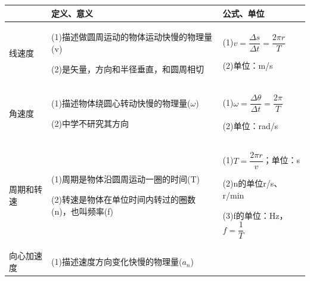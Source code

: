 \begin{longtable}[]{@{}m{2cm}m{9cm}m{4cm}@{}}
\toprule
& 定义、意义 & 公式、单位\tabularnewline
\midrule
\endhead
\begin{minipage}[t]{0.50\columnwidth}\raggedright
线速度\strut
\end{minipage} & \begin{minipage}[t]{0.60\columnwidth}\raggedright
(1)描述做圆周运动的物体运动快慢的物理量(v)

(2)是矢量，方向和半径垂直，和圆周相切\strut
\end{minipage} & \begin{minipage}[t]{0.30\columnwidth}\raggedright
(1)$v=\dfrac{\Delta s}{\Delta t}=\dfrac{2 \pi r}{T}$

(2)单位：m/s\strut
\end{minipage}\tabularnewline
\begin{minipage}[t]{0.50\columnwidth}\raggedright
角速度\strut
\end{minipage} & \begin{minipage}[t]{1\columnwidth}\raggedright
(1)描述物体绕圆心转动快慢的物理量($\omega$)

(2)中学不研究其方向\strut
\end{minipage} & \begin{minipage}[t]{0.50\columnwidth}\raggedright
(1)$\omega=\dfrac{\Delta \theta}{\Delta t}=\dfrac{2 \pi}{T}$

(2)单位：rad/s\strut
\end{minipage}\tabularnewline
\begin{minipage}[t]{0.50\columnwidth}\raggedright
周期和转速\strut
\end{minipage} & \begin{minipage}[t]{0.60\columnwidth}\raggedright
(1)周期是物体沿圆周运动一圈的时间(T)

(2)转速是物体在单位时间内转过的圈数(n)，也叫频率(f)\strut
\end{minipage} & \begin{minipage}[t]{0.30\columnwidth}\raggedright
(1)$T=\dfrac{2\pi r}{v}$；单位：s

(2)n的单位r/s、r/min

(3)f的单位：Hz，$f=\dfrac{1}{T}$\strut
\end{minipage}\tabularnewline
\begin{minipage}[t]{0.50\columnwidth}\raggedright
向心加速度\strut
\end{minipage} & \begin{minipage}[t]{0.60\columnwidth}\raggedright
(1)描述速度方向变化快慢的物理量($a_n$)


\end{minipage}
\end{longtable}
